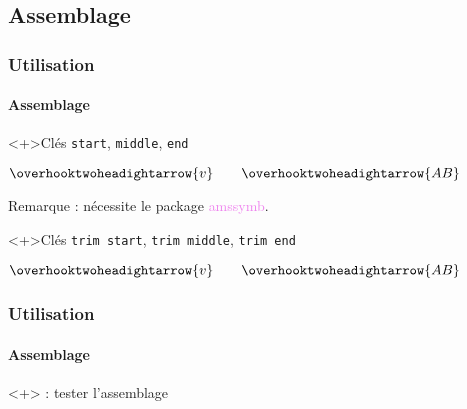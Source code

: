\documentclass[10pt, aspectratio=3218]{beamer}
\newcommand*{\pkg}[1]{\textcolor{violet}{\textsf{#1}}}
\newcommand*{\key}[1]{\textcolor{Option}{\texttt{\small #1}}}
\newcommand{\rmq}[1]{{\small #1}}
\begin{document}
\subsection{Assemblage}

\begin{frame}[fragile]

\frametitle{Utilisation}
\framesubtitle{Assemblage}

\begin{block}<+>{Clés \key{start}, \key{middle}, \key{end}}
\undef\overhooktwoheadightarrow%
  \begin{dispExample}
$\overhooktwoheadightarrow{v} \qquad \overhooktwoheadightarrow{AB}$
 \end{dispExample}

 \smallskip

 \rmq{\alert{Remarque :}  nécessite le package \pkg{amssymb}}.
\end{block}

\begin{block}<+>{Clés \key{trim start}, \key{trim middle}, \key{trim end}}
\undef\overhooktwoheadightarrow%
  \begin{dispExample}
$ \overhooktwoheadightarrow{v} \qquad \overhooktwoheadightarrow{AB} $
 \end{dispExample}
\end{block}

\end{frame}

\begin{frame}[fragile]

\frametitle{Utilisation}
\framesubtitle{Assemblage}

\setlength{\textwidth}{\dimeval{\paperwidth-20mm}}

\begin{block}<+>{ : tester l'assemblage}
  \begin{dispExample}
 \end{dispExample}
\end{block}

\end{frame}
\end{document}
